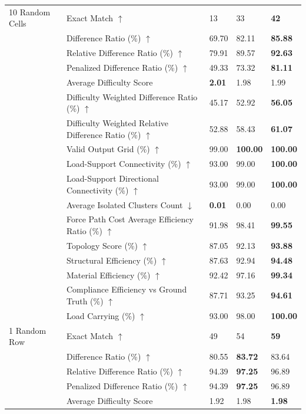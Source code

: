 \begin{table}[!h]
{\begin{tabular}{lllll}
10 Random Cells & Exact Match $\uparrow$ & 13 & 33 & \textbf{42} \\
 & Difference Ratio (\%) $\uparrow$ & 69.70 & 82.11 & \textbf{85.88} \\
 & Relative Difference Ratio (\%) $\uparrow$ & 79.91 & 89.57 & \textbf{92.63} \\
 & Penalized Difference Ratio (\%) $\uparrow$ & 49.33 & 73.32 & \textbf{81.11} \\
 & Average Difficulty Score & \textbf{2.01} & 1.98 & 1.99 \\
 & Difficulty Weighted Difference Ratio (\%) $\uparrow$ & 45.17 & 52.92 & \textbf{56.05} \\
 & Difficulty Weighted Relative Difference Ratio (\%) $\uparrow$ & 52.88 & 58.43 & \textbf{61.07} \\
 & Valid Output Grid (\%) $\uparrow$ & 99.00 & \textbf{100.00} & \textbf{100.00} \\
 & Load-Support Connectivity (\%) $\uparrow$ & 93.00 & 99.00 & \textbf{100.00} \\
 & Load-Support Directional Connectivity (\%) $\uparrow$ & 93.00 & 99.00 & \textbf{100.00} \\
 & Average Isolated Clusters Count $\downarrow$ & \textbf{0.01} & 0.00 & 0.00 \\
 & Force Path Cost Average Efficiency Ratio (\%) $\uparrow$ & 91.98 & 98.41 & \textbf{99.55} \\
 & Topology Score (\%) $\uparrow$ & 87.05 & 92.13 & \textbf{93.88} \\
 & Structural Efficiency (\%) $\uparrow$ & 87.63 & 92.94 & \textbf{94.48} \\
 & Material Efficiency (\%) $\uparrow$ & 92.42 & 97.16 & \textbf{99.34} \\
 & Compliance Efficiency vs Ground Truth (\%) $\uparrow$ & 87.71 & 93.25 & \textbf{94.61} \\
 & Load Carrying (\%) $\uparrow$ & 93.00 & 98.00 & \textbf{100.00} \\
1 Random Row & Exact Match $\uparrow$ & 49 & 54 & \textbf{59} \\
 & Difference Ratio (\%) $\uparrow$ & 80.55 & \textbf{83.72} & 83.64 \\
 & Relative Difference Ratio (\%) $\uparrow$ & 94.39 & \textbf{97.25} & 96.89 \\
 & Penalized Difference Ratio (\%) $\uparrow$ & 94.39 & \textbf{97.25} & 96.89 \\
 & Average Difficulty Score & 1.92 & 1.98 & \textbf{1.98} \\

\end{tabular}}
\end{table}
